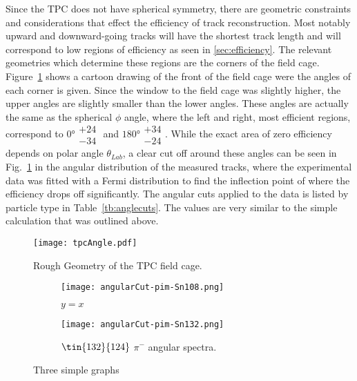 Since the TPC does not have spherical symmetry, there are geometric constraints and considerations that effect the efficiency of track reconstruction. Most notably upward and downward-going tracks will have the shortest track length and will correspond to low regions of efficiency as seen in \ref{sec:efficiency}. The relevant geometries which determine these regions are the corners of the field cage. Figure~\ref{fig:angleEffExplanation} shows a cartoon drawing of the front of the field cage were the angles of each corner is given. Since the window to the field cage was slightly higher, the upper angles are slightly smaller than the lower angles. These angles are actually the same as the spherical $\phi$ angle, where the left and right, most efficient regions, correspond to  $\ang{0}\substack{+24 \\ -34}$ and $\ang{180}\substack{+34 \\ -24}$.  While the exact area of zero efficiency depends on polar angle $\theta_{Lab}$, a clear cut off around these angles can be seen in Fig.~\ref{fig:angleEffExplanation} in the angular distribution of the measured tracks, where the experimental data was fitted with a Fermi distribution to find the inflection point of where the efficiency drops off significantly. The angular cuts applied to the data is listed by particle type in Table~\ref{tb:anglecuts}. The values are very similar to the simple calculation that was outlined above. 


\begin{figure}[!htb]
\centering
\texttt{[image: tpcAngle.pdf]}
\caption{Rough Geometry of the TPC field cage.}
\label{fig:angleEffExplanation}
\end{figure}


\begin{figure}[!htb]
     \centering
     \begin{subfigure}[b]{0.49\textwidth}
         \centering
         \texttt{[image: angularCut-pim-Sn108.png]}
         \caption{$y=x$}
         \label{fig:pim108angle}
     \end{subfigure}
     \hfill
     \begin{subfigure}[b]{0.49\textwidth}
         \centering
         \texttt{[image: angularCut-pim-Sn132.png]}
         \caption{$\tin{132}{124}$ $\pi^-$ angular spectra.}
         \label{fig:pim132angle}
     \end{subfigure}
        \caption{Three simple graphs}
        \label{fig:pim}
\end{figure}


